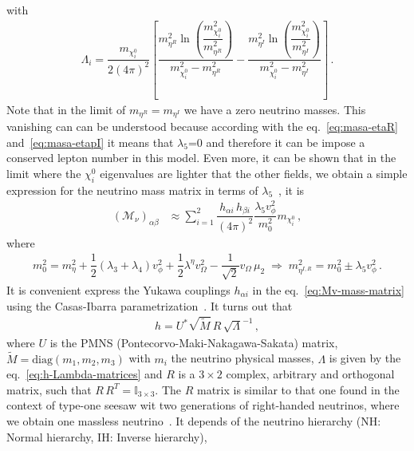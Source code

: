 \documentclass[12pt,letterpaper]{article}
\begin{document}
%
with
\begin{align}
\label{eq:Lambdai-definition}
\Lambda_i = \dfrac{m_{\chi_i^0}}{2(4\pi)^2}
\left[
\dfrac{m_{\eta^R}^2\ln\left(\dfrac{m_{\chi_i^0}^2}{m_{\eta^R}^2}\right)}{m_{\chi_i^0}^2-m_{\eta^R}^2}
-\dfrac{m_{\eta^I}^2\ln\left(\dfrac{m_{\chi_i^0}^2}{m_{\eta^I}^2}\right)}{m_{\chi_i^0}^2-m_{\eta^I}^2}
\right] \,.
\end{align}
%
Note that in the limit of $m_{\eta^R}= m_{\eta^I}$ we have a zero neutrino masses. This vanishing can can be understood because according with the eq.~\ref{eq:masa-etaR} and~\ref{eq:masa-etapI} it means that $\lambda_5$=0 and therefore it can be impose a conserved lepton number in this model. Even more, it can be shown that in the limit where the $\chi_i^0$ eigenvalues are lighter that the other fields, we obtain a simple expression for the neutrino mass matrix in terms of $\lambda_5$~\cite{Hirsch:2013ola}, it is
%
\begin{align}
\label{eq:Mv-aproximations}
(\mathcal{M}_\nu)_{\alpha\beta} &\approx \sum_{i=1}^2\dfrac{h_{\alpha i}\,h_{\beta i}}{(4\pi)^2}
\dfrac{\lambda_5 v_{\phi}^2}{m_0^2}
m_{\chi_i^0}\,,
\end{align}  
%
where 
\begin{align}
\label{ec_mo-definition}
m_0^2 = m_{\eta}^2 + \dfrac{1}{2}\left(\lambda_3+\lambda_4\right) v_{\phi}^2
+ \dfrac{1}{2}\lambda^{\eta}v_{\Omega}^2 - \dfrac{1}{\sqrt{2}}v_{\Omega}\,\mu_2\;
 \Rightarrow \;
 m_{\eta^{I,R}}^2 =m_0^2\pm\lambda_5 v_{\phi}^2\,.
\end{align}
%
It is convenient express the Yukawa couplings $h_{\alpha i}$ in the eq.~\ref{eq:Mv-mass-matrix} using the Casas-Ibarra parametrization~\cite{Casas:2001sr, Ibarra:2003up}. It turns out that
%
\begin{align}
h = U^*\sqrt{\widetilde{M}}\,R\,\sqrt{\Lambda}^{-1}\,, 
\end{align}
%
where $U$ is the PMNS (Pontecorvo-Maki-Nakagawa-Sakata) matrix, $\widetilde{M}=\text{diag}(m_1,m_2,m_3)$ with $m_i$ the neutrino physical masses, $\Lambda$ is given by the eq.~\ref{eq:h-Lambda-matrices} and $R$ is a $3\times 2$ complex, arbitrary and orthogonal matrix, such that $R\,R^T=\mathbb{I}_{3\times3}$. The $R$ matrix is similar to that one found in the context of type-one seesaw wit two generations of right-handed neutrinos, where we obtain one massless neutrino~\cite{Ibarra:2003up}. It depends of the neutrino hierarchy (NH: Normal hierarchy, IH: Inverse hierarchy),
%
\end{document}
